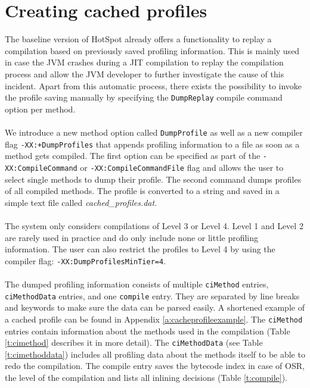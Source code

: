 \section{Creating cached profiles}
\label{s:creatingprofiles}
The baseline version of HotSpot already offers a functionality to replay a compilation based on previously saved profiling information.
This is mainly used in case the JVM crashes during a JIT compilation to replay the compilation process and allow the JVM developer to further investigate the cause of this incident.
Apart from this automatic process, there exists the possibility to invoke the profile saving manually by specifying the \texttt{DumpReplay} compile command option per method.
\\\\
We introduce a new method option called \texttt{DumpProfile} as well as a new compiler flag \newline\texttt{-XX:+DumpProfiles} that appends profiling information to a file as soon as a method gets compiled. The first option can be specified as part of the \texttt{-XX:CompileCommand} or \texttt{-XX:CompileCommandFile} flag and allows the user to select single methods to dump their profile. The second command dumps profiles of all compiled methods.
The profile is converted to a string and saved in a simple text file called \textit{cached\_profiles.dat}.
\\\\
The system only considers compilations of Level 3 or Level 4. Level 1 and Level 2 are rarely used in practice and do only include none or little profiling information. The user can also restrict the profiles to Level 4 by using the compiler flag: \texttt{-XX:DumpProfilesMinTier=4}.
\\\\
The dumped profiling information consists of multiple \texttt{ciMethod} entries, \texttt{ciMethodData} entries, and one \texttt{compile} entry. They are separated by line breaks and keywords to make sure the data can be parsed easily. A shortened example of a cached profile can be found in Appendix \ref{a:cacheprofileexample}. The \texttt{ciMethod} entries contain information about the methods used in the compilation (Table \ref{t:cimethod} describes it in more detail). The \texttt{ciMethodData} (see Table \ref{t:cimethoddata}) includes all profiling data about the methods itself to be able to redo the compilation.
The compile entry saves the bytecode index in case of OSR, the level of the compilation and lists all inlining decisions (Table \ref{t:compile}).
